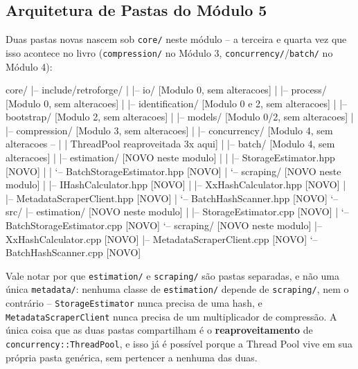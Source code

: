 \subsection{Arquitetura de Pastas do Módulo 5}

Duas pastas novas nascem sob \texttt{core/} neste módulo -- a terceira e quarta vez que isso acontece no livro (\texttt{compression/} no Módulo 3, \texttt{concurrency/}/\texttt{batch/} no Módulo 4):

\begin{CaixaArvore}
core/
|-- include/retroforge/
|   |-- io/                              [Modulo 0, sem alteracoes]
|   |-- process/                         [Modulo 0, sem alteracoes]
|   |-- identification/                  [Modulo 0 e 2, sem alteracoes]
|   |-- bootstrap/                       [Modulo 2, sem alteracoes]
|   |-- models/                          [Modulo 0/2, sem alteracoes]
|   |-- compression/                     [Modulo 3, sem alteracoes]
|   |-- concurrency/                     [Modulo 4, sem alteracoes --
|   |                                      ThreadPool reaproveitada 3x aqui]
|   |-- batch/                           [Modulo 4, sem alteracoes]
|   |-- estimation/                      [NOVO neste modulo]
|   |   |-- StorageEstimator.hpp         [NOVO]
|   |   `-- BatchStorageEstimator.hpp    [NOVO]
|   `-- scraping/                        [NOVO neste modulo]
|       |-- IHashCalculator.hpp          [NOVO]
|       |-- XxHashCalculator.hpp         [NOVO]
|       |-- MetadataScraperClient.hpp    [NOVO]
|       `-- BatchHashScanner.hpp         [NOVO]
`-- src/
    |-- estimation/                      [NOVO neste modulo]
    |   |-- StorageEstimator.cpp         [NOVO]
    |   `-- BatchStorageEstimator.cpp    [NOVO]
    `-- scraping/                        [NOVO neste modulo]
        |-- XxHashCalculator.cpp         [NOVO]
        |-- MetadataScraperClient.cpp    [NOVO]
        `-- BatchHashScanner.cpp         [NOVO]
\end{CaixaArvore}

\begin{CaixaInfo}
Vale notar por que \texttt{estimation/} e \texttt{scraping/} são pastas separadas, e não uma única \texttt{metadata/}: nenhuma classe de \texttt{estimation/} depende de \texttt{scraping/}, nem o contrário -- \texttt{StorageEstimator} nunca precisa de uma hash, e \texttt{MetadataScraperClient} nunca precisa de um multiplicador de compressão. A única coisa que as duas pastas compartilham é o \textbf{reaproveitamento} de \texttt{concurrency::ThreadPool}, e isso já é possível porque a Thread Pool vive em sua própria pasta genérica, sem pertencer a nenhuma das duas.
\end{CaixaInfo}


